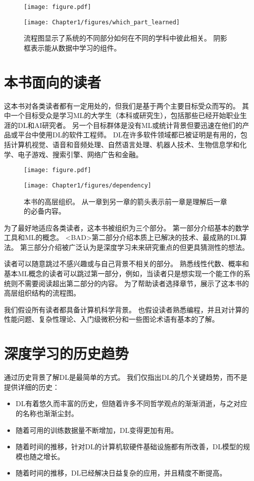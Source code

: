 \begin{figure}[!htb]
\ifOpenSource
\centerline{\texttt{[image: figure.pdf]}}
\else
\centerline{\texttt{[image: Chapter1/figures/which\_part\_learned]}}
\fi
\caption{流程图显示了系统的不同部分如何在不同的学科中彼此相关。
阴影框表示能从数据中学习的组件。}
\label{fig:chap1_which_part_learned}
\end{figure}

\section{本书面向的读者}
\label{sec:who_should_read_this_book}

这本书对各类读者都有一定用处的，但我们是基于两个主要目标受众而写的。
其中一个目标受众是学习\gls{ML}的大学生（本科或研究生），包括那些已经开始职业生涯的\gls{DL}和\gls{AI}研究者。
另一个目标群体是没有\gls{ML}或统计背景但要迅速在他们的产品或平台中使用\gls{DL}的软件工程师。
\gls{DL}在许多软件领域都已被证明是有用的，包括计算机视觉、语音和音频处理、自然语言处理、机器人技术、生物信息学和化学、电子游戏、搜索引擎、网络广告和金融。

\begin{figure}[H]
\ifOpenSource
\centerline{\texttt{[image: figure.pdf]}}
\else
\centerline{\texttt{[image: Chapter1/figures/dependency]}}
\fi
\caption{本书的高层组织。
从一章到另一章的箭头表示前一章是理解后一章的必备内容。}
\label{fig:chap1_dependency}
\end{figure}


为了最好地适应各类读者，这本书被组织为三个部分。
第一部分介绍基本的数学工具和\gls{ML}的概念。
<BAD>第二部分介绍本质上已解决的技术、最成熟的\gls{DL}算法。
第三部分介绍被广泛认为是深度学习未来研究重点的但更具猜测性的想法。

读者可以随意跳过不感兴趣或与自己背景不相关的部分。
熟悉线性代数、概率和基本\gls{ML}概念的读者可以跳过第一部分，例如，当读者只是想实现一个能工作的系统则不需要阅读超出第二部分的内容。
为了帮助读者选择章节，展示了这本书的高层组织结构的流程图。


我们假设所有读者都具备计算机科学背景。
也假设读者熟悉编程，并且对计算的性能问题、复杂性理论、入门级微积分和一些图论术语有基本的了解。
% 
\section{深度学习的历史趋势}
\label{sec:historical_trends_in_deep_learning}
通过历史背景了解\gls{DL}是最简单的方式。
我们仅指出\gls{DL}的几个关键趋势，而不是提供详细的历史：
\begin{itemize}
 \item \gls{DL}有着悠久而丰富的历史，但随着许多不同哲学观点的渐渐消逝，与之对应的名称也渐渐尘封。
 \item 随着可用的训练数据量不断增加，\gls{DL}变得更加有用。
 \item 随着时间的推移，针对\gls{DL}的计算机软硬件基础设施都有所改善，\gls{DL}模型的规模也随之增长。
 \item 随着时间的推移，\gls{DL}已经解决日益复杂的应用，并且精度不断提高。
\end{itemize}

